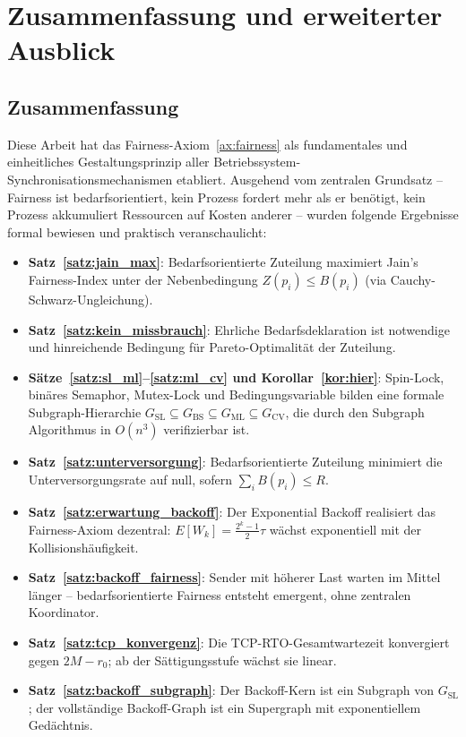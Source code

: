 ﻿\documentclass[a4paper,12pt]{article}
\theoremstyle{definition}
\begin{document}
\section{Zusammenfassung und erweiterter Ausblick}
\label{sec:ausblick}

\subsection{Zusammenfassung}

Diese Arbeit hat das Fairness-Axiom~\ref{ax:fairness} als
fundamentales und einheitliches Gestaltungsprinzip aller
Betriebssystem-Synchronisationsmechanismen etabliert.
Ausgehend vom zentralen Grundsatz -- Fairness ist
bedarfsorientiert, kein Prozess fordert mehr als er benötigt,
kein Prozess akkumuliert Ressourcen auf Kosten anderer --
wurden folgende Ergebnisse formal bewiesen und praktisch
veranschaulicht:

\begin{itemize}
  \item \textbf{Satz~\ref{satz:jain_max}}: Bedarfsorientierte
        Zuteilung maximiert Jain's Fairness-Index unter der
        Nebenbedingung $Z(p_i) \leq B(p_i)$ (via
        Cauchy-Schwarz-Ungleichung).
  \item \textbf{Satz~\ref{satz:kein_missbrauch}}: Ehrliche
        Bedarfsdeklaration ist notwendige und hinreichende
        Bedingung für Pareto-Optimalität der Zuteilung.
  \item \textbf{Sätze~\ref{satz:sl_ml}--\ref{satz:ml_cv}
        und Korollar~\ref{kor:hier}}: Spin-Lock, binäres
        Semaphor, Mutex-Lock und Bedingungsvariable bilden
        eine formale Subgraph-Hierarchie
        $G_{\mathrm{SL}} \subseteq G_{\mathrm{BS}}
        \subseteq G_{\mathrm{ML}} \subseteq G_{\mathrm{CV}}$,
        die durch den Subgraph Algorithmus in $O(n^3)$
        verifizierbar ist.
  \item \textbf{Satz~\ref{satz:unterversorgung}}: Bedarfsorientierte
        Zuteilung minimiert die Unterversorgungsrate auf null,
        sofern $\sum_i B(p_i) \leq R$.
  \item \textbf{Satz~\ref{satz:erwartung_backoff}}: Der
        Exponential Backoff realisiert das Fairness-Axiom
        dezentral: $E[W_k] = \frac{2^k-1}{2}\tau$ wächst
        exponentiell mit der Kollisionshäufigkeit.
  \item \textbf{Satz~\ref{satz:backoff_fairness}}: Sender
        mit höherer Last warten im Mittel länger -- bedarfsorientierte
        Fairness entsteht emergent, ohne zentralen Koordinator.
  \item \textbf{Satz~\ref{satz:tcp_konvergenz}}: Die TCP-RTO-Gesamtwartezeit
        konvergiert gegen $2M - r_0$; ab der Sättigungsstufe
        wächst sie linear.
  \item \textbf{Satz~\ref{satz:backoff_subgraph}}: Der
        Backoff-Kern ist ein Subgraph von $G_{\mathrm{SL}}$;
        der vollständige Backoff-Graph ist ein Supergraph
        mit exponentiellem Gedächtnis.
\end{itemize}
\end{document}

